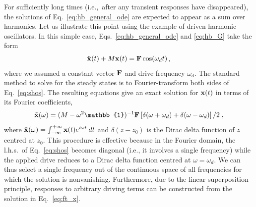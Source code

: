 For sufficiently long times (i.e.,~after any transient responses have disappeared), the solutions 
of Eq.~\eqref{eq:hb_general_ode} are expected to appear as a sum over harmonics. Let us illustrate this point using the example of driven harmonic oscillators. In this simple case, Eqs.~\eqref{eq:hb_general_ode} and \eqref{eq:hb_G} take the form
%
\begin{equation} \label{eq:shos}
\ddot{\vb{x}}(t) + M \vb{x}(t) = \vb{F} \cos(\omega_d t)\,,
\end{equation}
%
where we assumed a constant vector $\vb{F}$ and drive frequency $\omega_d$.	The standard method to solve for the steady states is to Fourier-transform both sides of Eq.~\eqref{eq:shos}. The resulting equations give an exact solution for $\vb{x}(t)$ in terms of its Fourier coefficients,
%
\begin{equation} \label{eq:ft_x}
\tilde{\vb{x}}(\omega) = (M - \omega^2 \mathbb{1})^{-1} \vb{F} \left[\delta(\omega + \omega_d) + \delta(\omega - \omega_d)\right] / 2\;,
\end{equation}
%
where $\tilde{\vb{x}}(\omega) = \int_{-\infty}^{+\infty} \vb{x}(t) e^{i\omega t}\: dt$ and $\delta(z-z_0)$ is the Dirac delta function of $z$ centred at $z_0$. This procedure is effective because in the Fourier domain, the l.h.s.~of Eq.~\eqref{eq:shos} becomes diagonal (i.e., it involves a single frequency) while the applied drive reduces to a Dirac delta function centred at $\omega=\omega_d$. We can thus select a single frequency out of the continuous space of all frequencies for which the solution is nonvanishing. Furthermore, due to the linear superposition principle, responses to arbitrary driving terms can be constructed from the solution in Eq.~\eqref{eq:ft_x}.

